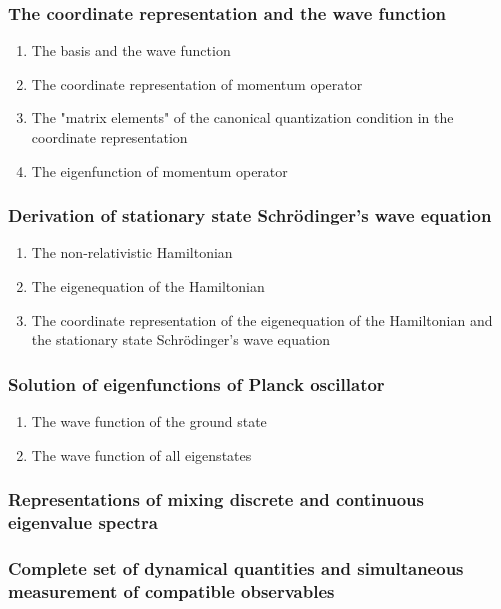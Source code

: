 \documentclass[12pt]{article}
\numberwithin{equation}{section}
\begin{document}
\subsubsection{The coordinate representation and the wave function}
\begin{enumerate}
\item The basis and the wave function
\item The coordinate representation of momentum operator
\item The "matrix elements" of the canonical quantization condition in the coordinate representation
\item The eigenfunction of momentum operator
\end{enumerate}
\subsubsection{Derivation of stationary state Schr\"{o}dinger's wave equation}
\begin{enumerate}
\item The non-relativistic Hamiltonian
\item The eigenequation of the Hamiltonian
\item The coordinate representation of the eigenequation of the Hamiltonian and
    the stationary state Schr\"{o}dinger's wave equation
\end{enumerate}
\subsubsection{Solution of eigenfunctions of Planck oscillator}
\begin{enumerate}
\item The wave function of the ground state   
\item The wave function of all eigenstates      
\end{enumerate}
\subsubsection{Representations of mixing discrete and continuous eigenvalue spectra}
\subsubsection{Complete set of dynamical quantities and simultaneous measurement of compatible observables}	
\end{document}
